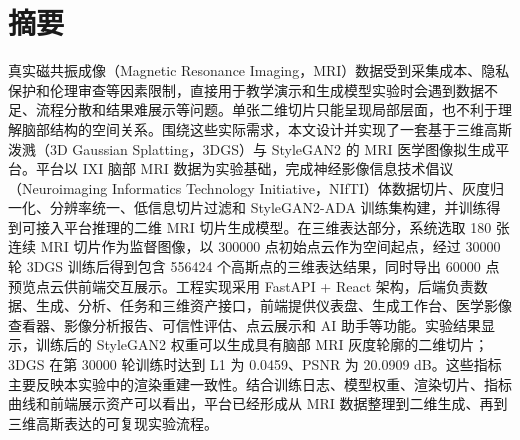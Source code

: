 \chapter*{\texorpdfstring{{\songti\bfseries\fontsize{16pt}{20pt}\selectfont 摘\quad 要}}{摘要}}
\thispagestyle{thesis-front}

{\songti\fontsize{12pt}{20pt}\selectfont
真实磁共振成像（Magnetic Resonance Imaging，MRI）数据受到采集成本、隐私保护和伦理审查等因素限制，直接用于教学演示和生成模型实验时会遇到数据不足、流程分散和结果难展示等问题。单张二维切片只能呈现局部层面，也不利于理解脑部结构的空间关系。围绕这些实际需求，本文设计并实现了一套基于三维高斯泼溅（3D Gaussian Splatting，3DGS）与 StyleGAN2 的 MRI 医学图像拟生成平台。平台以 IXI 脑部 MRI 数据为实验基础，完成神经影像信息技术倡议（Neuroimaging Informatics Technology Initiative，NIfTI）体数据切片、灰度归一化、分辨率统一、低信息切片过滤和 StyleGAN2-ADA 训练集构建，并训练得到可接入平台推理的二维 MRI 切片生成模型。在三维表达部分，系统选取 180 张连续 MRI 切片作为监督图像，以 300000 点初始点云作为空间起点，经过 30000 轮 3DGS 训练后得到包含 556424 个高斯点的三维表达结果，同时导出 60000 点预览点云供前端交互展示。工程实现采用 FastAPI + React 架构，后端负责数据、生成、分析、任务和三维资产接口，前端提供仪表盘、生成工作台、医学影像查看器、影像分析报告、可信性评估、点云展示和 AI 助手等功能。实验结果显示，训练后的 StyleGAN2 权重可以生成具有脑部 MRI 灰度轮廓的二维切片；3DGS 在第 30000 轮训练时达到 L1 为 0.0459、PSNR 为 20.0909 dB。这些指标主要反映本实验中的渲染重建一致性。结合训练日志、模型权重、渲染切片、指标曲线和前端展示资产可以看出，平台已经形成从 MRI 数据整理到二维生成、再到三维高斯表达的可复现实验流程。
\par}

\vspace{1em}

